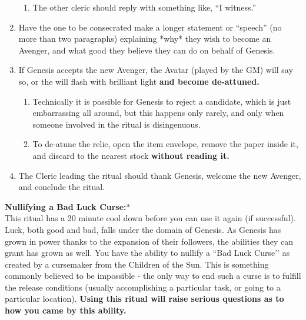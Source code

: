\documentclass[green]{GL2020}
\begin{document}
\begin{enumerate}
  \begin{enumerate}
    \item The other cleric should reply with something like, ``I witness.''
  \end{enumerate}
  \item Have the one to be consecrated make a longer statement or “speech” (no more than two paragraphs) explaining *why* they wish to become an Avenger, and what good they believe they can do on behalf of Genesis.
  \item If Genesis accepts the new Avenger, the Avatar (played by the GM) will say so, or the \iHorseshoe{} will flash with brilliant light \textbf{and become de-attuned.}
  \begin{enumerate}
    \item Technically it is possible for Genesis to reject a candidate, which is just embarrassing all around, but this happens only rarely, and only when someone involved in the ritual is disingenuous.
    \item To de-atune the relic, open the item envelope, remove the paper inside it, and discard to the nearest stock \textbf{without reading it.}
  \end{enumerate}
  \item The Cleric leading the ritual should thank Genesis, welcome the new Avenger, and conclude the ritual.  
\end{enumerate}
   
\textbf{Nullifying a Bad Luck Curse:}$*$\\
This ritual has a 20 minute cool down before you can use it again (if successful). Luck, both good and bad, falls under the domain of Genesis. As Genesis has grown in power thanks to the expansion of their followers, the abilities they can grant has grown as well. You have the ability to nullify a ``Bad Luck Curse’’ as created by a cursemaker from the Children of the Sun. This is something commonly believed to be impossible - the only way to end such a curse is to fulfill the release conditions (usually accomplishing a particular task, or going to a particular location). \textbf{Using this ritual will raise serious questions as to how you came by this ability.}
\end{document}
